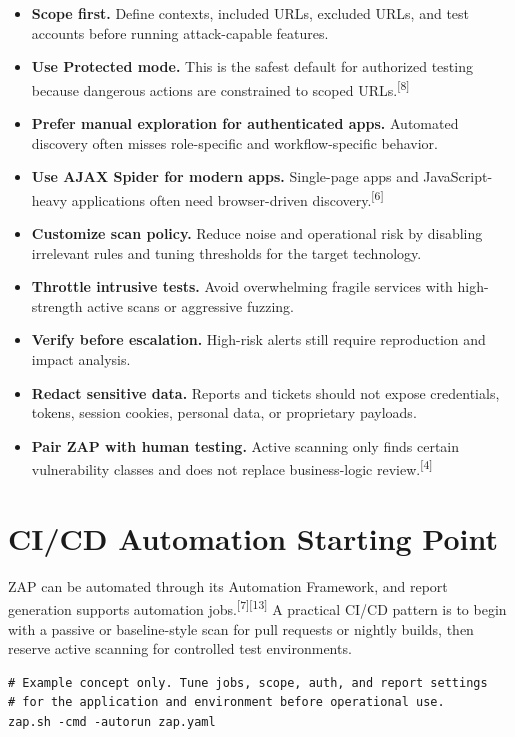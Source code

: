 \documentclass[11pt]{article}
\providecommand{\term}[1]{\textbf{#1}}
\newcommand{\source}[1]{\textsuperscript{[#1]}}
\begin{document}
\begin{itemize}
  \item \term{Scope first.} Define contexts, included URLs, excluded URLs, and test accounts before running attack-capable features.
  \item \term{Use Protected mode.} This is the safest default for authorized testing because dangerous actions are constrained to scoped URLs.\source{8}
  \item \term{Prefer manual exploration for authenticated apps.} Automated discovery often misses role-specific and workflow-specific behavior.
  \item \term{Use AJAX Spider for modern apps.} Single-page apps and JavaScript-heavy applications often need browser-driven discovery.\source{6}
  \item \term{Customize scan policy.} Reduce noise and operational risk by disabling irrelevant rules and tuning thresholds for the target technology.
  \item \term{Throttle intrusive tests.} Avoid overwhelming fragile services with high-strength active scans or aggressive fuzzing.
  \item \term{Verify before escalation.} High-risk alerts still require reproduction and impact analysis.
  \item \term{Redact sensitive data.} Reports and tickets should not expose credentials, tokens, session cookies, personal data, or proprietary payloads.
  \item \term{Pair ZAP with human testing.} Active scanning only finds certain vulnerability classes and does not replace business-logic review.\source{4}
\end{itemize}

\section{CI/CD Automation Starting Point}

ZAP can be automated through its Automation Framework, and report generation supports automation jobs.\source{7}\source{13} A practical CI/CD pattern is to begin with a passive or baseline-style scan for pull requests or nightly builds, then reserve active scanning for controlled test environments.

\begin{verbatim}
# Example concept only. Tune jobs, scope, auth, and report settings
# for the application and environment before operational use.
zap.sh -cmd -autorun zap.yaml
\end{verbatim}
\end{document}
